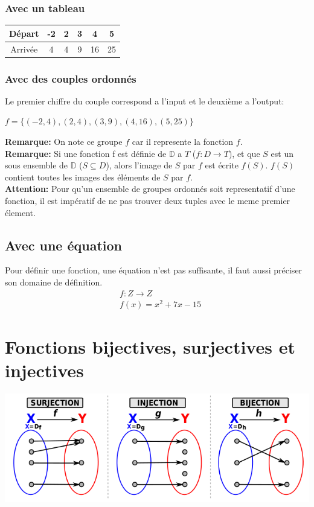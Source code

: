 \documentclass{article}
\begin{document}
\subsubsection{Avec un tableau}
\begin{center}
  \begin{tabular}{ c | c c c c c}
    Départ & -2 & 2 & 3 & 4 & 5\\
    \hline
    Arrivée & 4 & 4 & 9 & 16 & 25
 \end{tabular}
\end{center} 

\subsubsection{Avec des couples ordonnés}
Le premier chiffre du couple correspond a l'input et le deuxième a l'output:\\
\begin{center}
$f = \{(-2,4), (2,4), (3,9), (4,16), (5,25) \}$
\end{center}
\textbf{Remarque:} On note ce groupe $f$ car il represente la fonction $f$.\\
\textbf{Remarque:} Si une fonction f est définie de $\mathbb{D}$ a $T$ ($f : D \to T$), et que $S$ est un sous ensemble de $\mathbb{D}$ ($S \subseteq D$), alors l'image de $S$ par $f$ est écrite $f(S)$. $f(S)$ contient toutes les images des éléments de $S$ par $f$.\\
\textbf{Attention:} Pour qu'un ensemble de groupes ordonnés soit representatif d'une fonction, il est impératif de ne pas trouver deux tuples avec le meme premier élement.

\subsection{Avec une équation}
Pour définir une fonction, une équation n'est pas suffisante, il faut aussi préciser son domaine de définition.\\
\begin{align*}
  &f : Z \to Z\\
  &f(x) = x^2 + 7x - 15
\end{align*}
  
\section{Fonctions bijectives, surjectives et injectives}
\begin{center}
  \includegraphics[scale=0.5]{surjection_injection_bijection}
\end{center}
\end{document}
